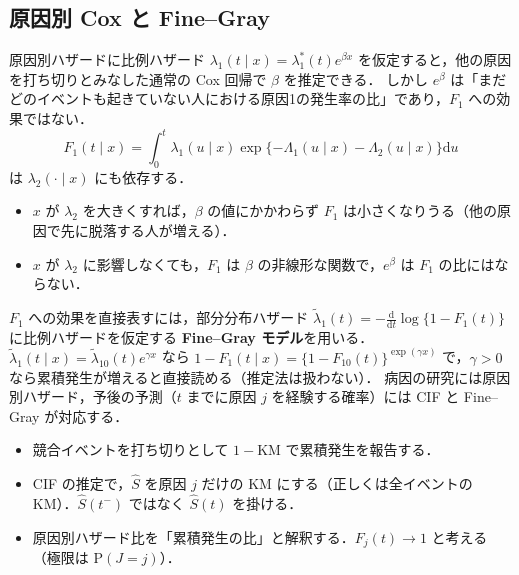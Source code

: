 \documentclass[a4paper,11pt,openany]{ltjsbook}
\newcommand{\Prob}{\mathrm{P}}
\newcommand{\dd}{\mathrm{d}}
\begin{document}
\subsection{原因別 Cox と Fine--Gray}
原因別ハザードに比例ハザード $\lambda_1(t\mid x)=\lambda_1^*(t)e^{\beta x}$ を仮定すると，他の原因を打ち切りとみなした通常の Cox 回帰で $\beta$ を推定できる．
しかし $e^\beta$ は「まだどのイベントも起きていない人における原因1の発生率の比」であり，$F_1$ への効果ではない．
\[
F_1(t\mid x)=\int_0^t\lambda_1(u\mid x)\exp\{-\Lambda_1(u\mid x)-\Lambda_2(u\mid x)\}\dd u
\]
は $\lambda_2(\cdot\mid x)$ にも依存する．
\begin{itemize}
\item $x$ が $\lambda_2$ を大きくすれば，$\beta$ の値にかかわらず $F_1$ は小さくなりうる（他の原因で先に脱落する人が増える）．
\item $x$ が $\lambda_2$ に影響しなくても，$F_1$ は $\beta$ の非線形な関数で，$e^\beta$ は $F_1$ の比にはならない．
\end{itemize}
$F_1$ への効果を直接表すには，部分分布ハザード $\tilde\lambda_1(t)=-\frac{\dd}{\dd t}\log\{1-F_1(t)\}$ に比例ハザードを仮定する \textbf{Fine--Gray モデル}を用いる．
$\tilde\lambda_1(t\mid x)=\tilde\lambda_{10}(t)e^{\gamma x}$ なら $1-F_1(t\mid x)=\{1-F_{10}(t)\}^{\exp(\gamma x)}$ で，$\gamma>0$ なら累積発生が増えると直接読める（推定法は扱わない）．
病因の研究には原因別ハザード，予後の予測（$t$ までに原因 $j$ を経験する確率）には CIF と Fine--Gray が対応する．

\begin{warnbox}
\begin{itemize}
\item 競合イベントを打ち切りとして $1-\mathrm{KM}$ で累積発生を報告する．
\item CIF の推定で，$\hat S$ を原因 $j$ だけの KM にする（正しくは全イベントの KM）．$\hat S(t^-)$ ではなく $\hat S(t)$ を掛ける．
\item 原因別ハザード比を「累積発生の比」と解釈する．$F_j(t)\to1$ と考える（極限は $\Prob(J=j)$）．
\end{itemize}
\end{warnbox}

\end{document}
